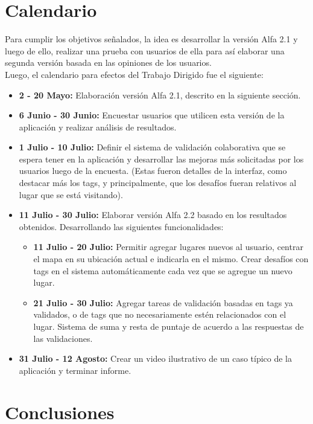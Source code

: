 \documentclass[10pt,letterpaper]{article}
\begin{document}
\newpage
\section{Calendario}

Para cumplir los objetivos señalados, la idea es desarrollar la versión Alfa 2.1 y luego de ello, realizar una prueba con usuarios de ella para así elaborar una segunda versión basada en las opiniones de los usuarios.\\

Luego, el calendario para efectos del Trabajo Dirigido fue el siguiente:\\

\begin{itemize}
\item \textbf{2 - 20 Mayo:} Elaboración versión Alfa 2.1, descrito en la siguiente sección.
\item \textbf{6 Junio - 30 Junio:} Encuestar usuarios que utilicen esta versión de la aplicación y realizar análisis de resultados.
\item \textbf{1 Julio - 10 Julio:} Definir el sistema de validación colaborativa que se espera tener en la aplicación y desarrollar las mejoras más solicitadas por los usuarios luego de la encuesta. (Estas fueron detalles de la interfaz, como destacar más los tags, y principalmente, que los desafíos fueran relativos al lugar que se está visitando).
 \item \textbf{11 Julio - 30 Julio:} Elaborar versión Alfa 2.2 basado en los resultados obtenidos. Desarrollando las siguientes funcionalidades:
  \begin{itemize}
  \item \textbf{11 Julio - 20 Julio:} Permitir agregar lugares nuevos al usuario, centrar el mapa en su ubicación actual e indicarla en el mismo. Crear desafíos con tags en el sistema automáticamente cada vez que se agregue un nuevo lugar.
  \item \textbf{21 Julio - 30 Julio:} Agregar tareas de validación basadas en tags ya validados, o de tags que no necesariamente estén relacionados con el lugar. Sistema de suma y resta de puntaje de acuerdo a las respuestas de las validaciones.
  \end{itemize}
 \item \textbf{31 Julio - 12 Agosto:} Crear un video ilustrativo de un caso típico de la aplicación y terminar informe. 
\end{itemize}

\newpage
\section{Conclusiones}
\end{document}
